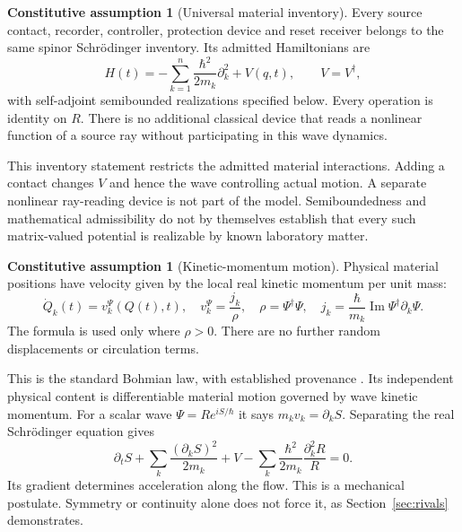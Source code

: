\documentclass[11pt]{article}
\theoremstyle{definition}\newtheorem{assumption}[theorem]{Constitutive assumption}
\theoremstyle{remark}\newtheorem{remark}[theorem]{Remark}
\begin{document}
\begin{assumption}[Universal material inventory]\label{ax:material}
Every source contact, recorder, controller, protection device and reset receiver belongs to the same spinor Schr\"odinger inventory. Its admitted Hamiltonians are
\begin{equation}\label{eq:H}
 H(t)=-\sum_{k=1}^n\frac{\hbar^2}{2m_k}\partial_k^2+V(q,t),
 \qquad V=V^\dagger,
\end{equation}
with self-adjoint semibounded realizations specified below. Every operation is identity on $R$. There is no additional classical device that reads a nonlinear function of a source ray without participating in this wave dynamics.
\end{assumption}
This inventory statement restricts the admitted material interactions. Adding a contact changes $V$ and hence the wave controlling actual motion. A separate nonlinear ray-reading device is not part of the model. Semiboundedness and mathematical admissibility do not by themselves establish that every such matrix-valued potential is realizable by known laboratory matter.

\begin{assumption}[Kinetic-momentum motion]\label{ax:motion}
Physical material positions have velocity given by the local real kinetic momentum per unit mass:
\begin{equation}\label{eq:guidance}
 \dot Q_k(t)=v_k^\Psi(Q(t),t),\quad
 v_k^\Psi=\frac{j_k}{\rho},\quad
 \rho=\Psi^\dagger\Psi,\quad
 j_k=\frac{\hbar}{m_k}\operatorname{Im}\Psi^\dagger\partial_k\Psi.
\end{equation}
The formula is used only where $\rho>0$. There are no further random displacements or circulation terms.
\end{assumption}
This is the standard Bohmian law, with established provenance \cite{BohmI,BohmII,DGZoperators}. Its independent physical content is differentiable material motion governed by wave kinetic momentum. For a scalar wave $\Psi=Re^{iS/\hbar}$ it says $m_kv_k=\partial_kS$. Separating the real Schr\"odinger equation gives
\[
 \partial_tS+\sum_k\frac{(\partial_kS)^2}{2m_k}+V
 -\sum_k\frac{\hbar^2}{2m_k}\frac{\partial_k^2R}{R}=0.
\]
Its gradient determines acceleration along the flow. This is a mechanical postulate. Symmetry or continuity alone does not force it, as Section~\ref{sec:rivals} demonstrates.
\end{document}
